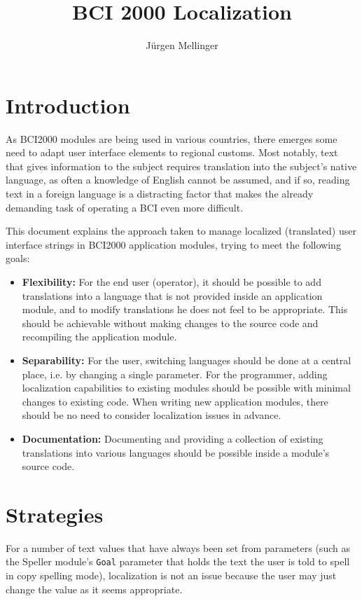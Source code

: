 \documentclass[12pt,letterpaper]{article}
\title{BCI 2000 Localization}
\author{J\"{u}rgen Mellinger}
\begin{document}
\maketitle
\tableofcontents

\pagebreak
\section{Introduction}

As BCI2000 modules are being used in various countries, there emerges some need
to adapt user interface elements to regional customs. Most notably, text that
gives information to the subject requires translation into the subject's native
language, as often a knowledge of English cannot be assumed, and if so, reading
text in a foreign language is a distracting factor that makes the already demanding
task of operating a BCI even more difficult.

This document explains the approach taken to manage localized (translated) user interface
strings in BCI2000 application modules, trying to meet the following goals:

\begin{itemize}
\item\textbf{Flexibility:}
For the end user (operator), it should be possible to add translations into a language that is not provided inside an
application module, and to modify translations he does not feel to be appropriate.
This should be achievable without making changes to the source code and recompiling the application module.
\item\textbf{Separability:}
For the user, switching languages should be done at a central place, i.e. by changing a single parameter.
For the programmer,
adding localization capabilities to existing modules should
be possible with minimal changes to existing code.
When writing new application modules, there should be no need to consider localization issues in advance.
\item\textbf{Documentation:}
Documenting and providing a collection of existing translations into various languages should be possible inside a module's source code.
\end{itemize}


\section{Strategies}

For a number of text values that have always been set from parameters (such as the Speller module's \texttt{Goal} parameter that holds the text the user is told to spell in copy spelling mode), localization is not an issue because the user may just change the value as it seems appropriate.
\end{document}

